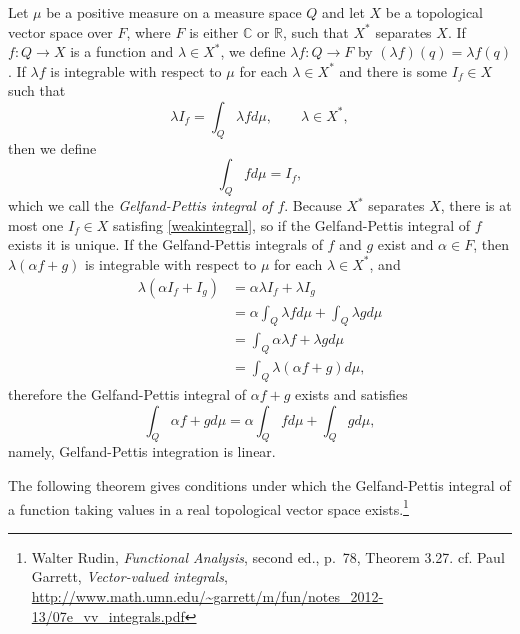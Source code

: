 \documentclass{article}
\theoremstyle{definition}
\begin{document}
Let  $\mu$ be a positive measure on a measure space $Q$ and let $X$ be a topological vector space over $F$, where
$F$ is either $\mathbb{C}$ or $\mathbb{R}$,
such that $X^*$ separates $X$.
If $f:Q \to X$ is a function and $\lambda \in X^*$, we define $\lambda f:Q \to F$
by $(\lambda f)(q)=\lambda f(q)$. If $\lambda f$ is integrable with respect to $\mu$ for each $\lambda \in X^*$
 and there is some $I_f \in X$ such that
 \begin{equation}
 \lambda I_f=\int_Q \lambda f d\mu, \qquad \lambda \in X^*,
 \label{weakintegral}
 \end{equation}
 then we define 
 \[
 \int_Q f d\mu =I_f,
 \]
 which we call the {\em Gelfand-Pettis integral of $f$}.
Because $X^*$ separates $X$, there is at most one $I_f \in X$ satisfing \eqref{weakintegral}, so if the Gelfand-Pettis integral
of $f$ exists it is unique. If the Gelfand-Pettis integrals of $f$ and $g$ exist and $\alpha \in F$, then
$\lambda(\alpha f +g)$ is integrable with respect to $\mu$ for each $\lambda \in X^*$, and 
\begin{align*}
\lambda(\alpha I_f+I_g)&=\alpha \lambda I_f + \lambda I_g\\
&=\alpha\int_Q \lambda f d\mu + \int_Q \lambda g d\mu\\
&=\int_Q \alpha \lambda f + \lambda g d\mu\\
&=\int_Q \lambda (\alpha f + g) d\mu,
\end{align*}
 therefore the Gelfand-Pettis integral of $\alpha f +g$ exists and satisfies
\[
\int_Q \alpha f +g d\mu = \alpha \int_Q f d\mu + \int_Q g d\mu,
\]
namely, Gelfand-Pettis integration is linear.

The following theorem gives conditions under which the Gelfand-Pettis integral  of a function taking values in a real topological
vector space exists.\footnote{Walter Rudin, {\em Functional Analysis}, second ed., p.~78, Theorem 3.27. cf. Paul Garrett, {\em Vector-valued integrals},
\url{http://www.math.umn.edu/~garrett/m/fun/notes_2012-13/07e_vv_integrals.pdf}} 
\end{document}

